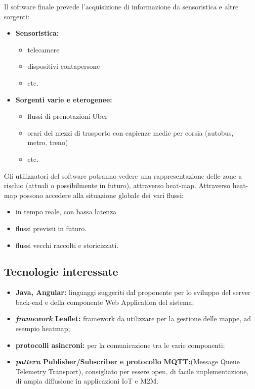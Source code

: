Il software finale prevede l'acquisizione di informazione da sensoristica e altre sorgenti:
\begin{itemize}
	\item{\textbf{Sensoristica:}}
	    \begin{itemize}
	        \item telecamere
	        \item dispositivi contapersone
	        \item etc.
	    \end{itemize}
	\item{\textbf{Sorgenti varie e eterogenee:}}
	    \begin{itemize}
	        \item flussi di prenotazioni Uber
	        \item orari dei mezzi di trasporto con capienze medie per corsia (autobus, metro, treno)
	        \item etc.
	\end{itemize}
\end{itemize}
Gli utilizzatori del software potranno vedere una rappresentazione delle zone a rischio (attuali o possibilmente in futuro), attraverso heat-map.
Attraverso heat-map possono accedere alla situazione globale dei vari flussi:
\begin{itemize}
    \item in tempo reale, con bassa latenza
    \item flussi previsti in futuro.
    \item flussi vecchi raccolti e storicizzati.
\end{itemize}


\subsection{Tecnologie interessate}

\begin{itemize}
	\item{\textbf{Java, Angular:}} linguaggi suggeriti dal proponente per lo sviluppo del server back-end e della componente Web Application del sistema;
	\item{\textbf{\textit{framework} Leaflet:}} framework da utilizzare per la gestione delle mappe, ad esempio heatmap;
	\item{\textbf{protocolli asincroni:}} per la comunicazione tra le varie componenti;  
	\item{\textbf{\textit{pattern} Publisher/Subscriber e protocollo MQTT:}}\newline (Message Queue Telemetry Transport), consigliato per essere open, di facile implementazione, di ampia diffusione in applicazioni IoT e M2M.
\end{itemize}

